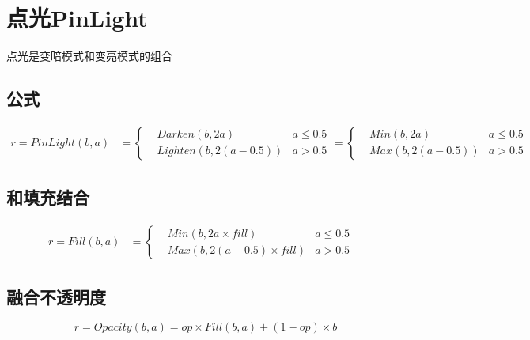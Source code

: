 %
%

\newpage
\section{ 点光PinLight}

点光是变暗模式和变亮模式的组合

\subsection{ 公式}

\begin{equation}
	\begin{aligned}r=PinLight(b,a)&=\left\{ \begin{aligned}&Darken(b,2a)&a\leq 0.5\\&Lighten(b,2(a-0.5))&a> 0.5  \end{aligned}\right.=\left\{ \begin{aligned}&Min(b,2a)&a\leq 0.5\\&Max(b,2(a-0.5))&a> 0.5  \end{aligned}\right.\end{aligned}
	\end{equation}

\subsection{ 和填充结合}

\begin{equation}
	\begin{aligned}
		r= Fill(b,a)&=\left\{ \begin{aligned}&Min(b,2a\times fill)&a\leq 0.5\\&Max(b,2(a-0.5)\times fill)&a> 0.5  \end{aligned}\right.&
	\end{aligned}
	\end{equation}

\subsection{ 融合不透明度}

\begin{equation}
	r=Opacity(b,a)=op\times Fill(b,a)+(1-op)\times b
	\end{equation}

